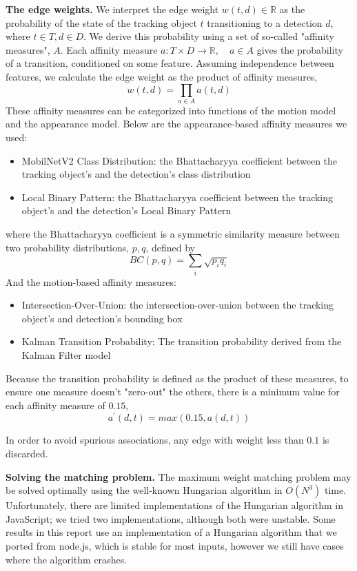 \documentclass[10pt,twocolumn,letterpaper]{article}
\begin{document}
\textbf{The edge weights.}
We interpret the edge weight $w(t,d) \in \mathbb{R}$ as the probability of the state of the tracking object $t$ transitioning to a detection $d$, where $t \in T, d\in D$.
We derive this probability using a set of so-called "affinity measures", $A$.
Each affinity measure $a: T \times D \to \mathbb{R}, \quad a \in A$  gives the probability of a transition, conditioned on some feature.
Assuming independence between features, we calculate the edge weight as the product of affinity measures,
$$ w(t,d) = \prod_{a \in A} a(t,d) $$
These affinity measures can be categorized into functions of the motion model and the appearance model.
Below are the appearance-based affinity measures we used:
\begin{itemize}
\item MobilNetV2 Class Distribution: the Bhattacharyya coefficient between the tracking object's and the detection's class distribution \cite{s2018mobilenetv2}
\item Local Binary Pattern: the Bhattacharyya coefficient between the tracking object's and the detection's Local Binary Pattern \cite{local_bin_patterns}
\end{itemize}
where the Bhattacharyya coefficient is a symmetric similarity measure between two probability distributions, $p,q$, defined by
$$BC(p,q) = \sum_{i} \sqrt{p_i q_i}$$
And the motion-based affinity measures:
\begin{itemize}
\item Intersection-Over-Union: the intersection-over-union between the tracking object's and detection's bounding box
\item Kalman Transition Probability: The transition probability derived from the Kalman Filter model
\end{itemize}
Because the transition probability is defined as the product of these measures, to ensure one measure doesn't "zero-out" the others, there is a minimum value for each affinity measure of $0.15$, $$a^\prime(d,t) = max(0.15, a(d,t))$$

In order to avoid spurious associations, any edge with weight less than $0.1$ is discarded.

\label{greedy_vs_hungarian}
\textbf{Solving the matching problem.}
The maximum weight matching problem may be solved optimally using the well-known Hungarian algorithm in $O(N^3)$ time.
Unfortunately, there are limited implementations of the Hungarian algorithm in JavaScript; we tried two implementations, although both were unstable.
Some results in this report use an implementation of a Hungarian algorithm that we ported from node.js, which is stable for most inputs, however we still have cases where the algorithm crashes.
\end{document}
